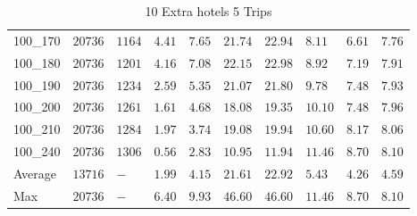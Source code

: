 \begin{center}
\begin{table}[]
\begin{adjustwidth}{-0.4in}{-1in}
\begin{tabular}{|lll|l|l|ll|lll|}
100\_170& $20736$  & $1164$ & $4.41$ & $7.65$   & $21.74$ & $22.94$ & $8.11 $ & $6.61$ & $7.76$ \\
100\_180& $20736$  & $1201$ & $4.16$ & $7.08$   & $22.15$ & $22.98$ & $8.92 $ & $7.19$ & $7.91$ \\
100\_190& $20736$  & $1234$ & $2.59$ & $5.35$   & $21.07$ & $21.80$ & $9.78 $ & $7.48$ & $7.93$ \\
100\_200& $20736$  & $1261$ & $1.61$ & $4.68$   & $18.08$ & $19.35$ & $10.10$ & $7.48$ & $7.96$ \\
100\_210& $20736$  & $1284$ & $1.97$ & $3.74$   & $19.08$ & $19.94$ & $10.60$ & $8.17$ & $8.06$ \\
100\_240& $20736$  & $1306$ & $0.56$ & $2.83$   & $10.95$ & $11.94$ & $11.46$ & $8.70$ & $8.10$ \\
\hline
Average & $13716$  & $-   $ & $1.99$ & $4.15$   & $21.61$ & $22.92$ & $5.43 $ & $4.26$ & $4.59$ \\
Max     & $20736$  & $-   $ & $6.40$ & $9.93$   & $46.60$ & $46.60$ & $11.46$ & $8.70$ & $8.10$ \\
\hline
\end{tabular}
    \end{adjustwidth}
    \caption{10 Extra hotels 5 Trips}
    \label{10-5}
    \end{table}
\end{center}
